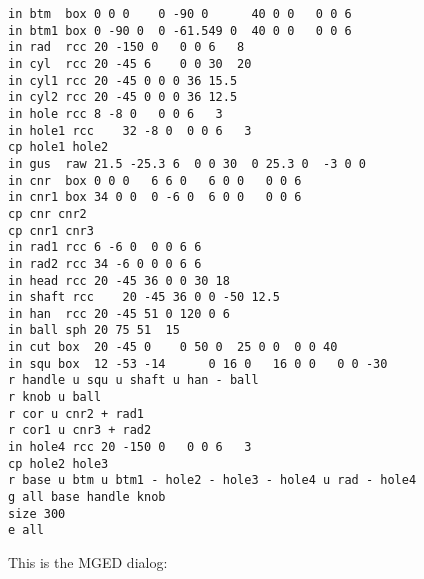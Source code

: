 \begin{verbatim}
in btm	box	0 0 0    0 -90 0      40 0 0   0 0 6
in btm1	box	0 -90 0  0 -61.549 0  40 0 0   0 0 6
in rad	rcc	20 -150 0   0 0 6   8
in cyl	rcc	20 -45 6    0 0 30  20
in cyl1 rcc	20 -45 0 0 0 36 15.5
in cyl2 rcc	20 -45 0 0 0 36 12.5
in hole rcc	8 -8 0   0 0 6   3
in hole1 rcc	32 -8 0  0 0 6   3
cp hole1 hole2
in gus	raw	21.5 -25.3 6  0 0 30  0 25.3 0  -3 0 0
in cnr	box	0 0 0	6 6 0	6 0 0	0 0 6
in cnr1	box	34 0 0	0 -6 0	6 0 0	0 0 6
cp cnr cnr2
cp cnr1 cnr3
in rad1 rcc	6 -6 0	0 0 6 6
in rad2 rcc	34 -6 0	0 0 6 6
in head rcc	20 -45 36 0 0 30 18
in shaft rcc	20 -45 36 0 0 -50 12.5
in han	rcc	20 -45 51 0 120 0 6
in ball sph	20 75 51  15
in cut box	20 -45 0	0 50 0	25 0 0	0 0 40
in squ box	12 -53 -14  	0 16 0   16 0 0   0 0 -30
r handle u squ u shaft u han - ball
r knob u ball
r cor u cnr2 + rad1
r cor1 u cnr3 + rad2
in hole4 rcc 20 -150 0   0 0 6   3
cp hole2 hole3
r base u btm u btm1 - hole2 - hole3 - hole4 u rad - hole4
g all base handle knob
size 300
e all
\end{verbatim}

This is the MGED dialog:

